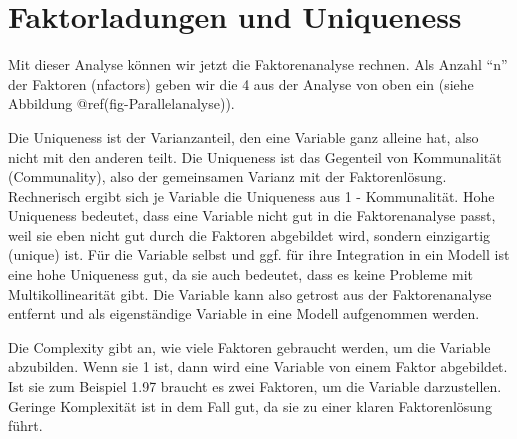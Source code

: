 \documentclass[
  10pt,
  letterpaper,
  a4paper, twoside]{scrreprt}
\begin{document}
\section{Faktorladungen und
Uniqueness}\label{faktorladungen-und-uniqueness}

Mit dieser Analyse können wir jetzt die Faktorenanalyse rechnen. Als
Anzahl \enquote{n} der Faktoren (nfactors) geben wir die 4 aus der
Analyse von oben ein (siehe Abbildung
@ref(fig-Parallelanalyse)).

Die Uniqueness ist der Varianzanteil, den eine Variable ganz alleine
hat, also nicht mit den anderen teilt. Die Uniqueness ist das Gegenteil
von Kommunalität (Communality), also der gemeinsamen Varianz mit der
Faktorenlösung. Rechnerisch ergibt sich je Variable die Uniqueness aus 1
- Kommunalität. Hohe Uniqueness bedeutet, dass eine Variable nicht gut
in die Faktorenanalyse passt, weil sie eben nicht gut durch die Faktoren
abgebildet wird, sondern einzigartig (unique) ist. Für die Variable
selbst und ggf. für ihre Integration in ein Modell ist eine hohe
Uniqueness gut, da sie auch bedeutet, dass es keine Probleme mit
Multikollinearität gibt. Die Variable kann also getrost aus der
Faktorenanalyse entfernt und als eigenständige Variable in eine Modell
aufgenommen werden.

Die Complexity gibt an, wie viele Faktoren gebraucht werden, um die
Variable abzubilden. Wenn sie 1 ist, dann wird eine Variable von einem
Faktor abgebildet. Ist sie zum Beispiel 1.97 braucht es zwei Faktoren,
um die Variable darzustellen. Geringe Komplexität ist in dem Fall gut,
da sie zu einer klaren Faktorenlösung führt.
\end{document}
